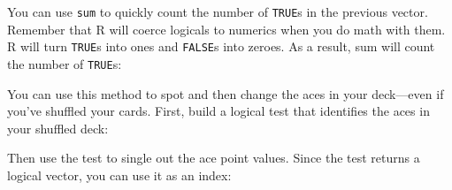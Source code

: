 \documentclass[
  letterpaper,
  DIV=11,
  numbers=noendperiod]{scrbook}
\newenvironment{Shaded}{\begin{snugshade}}{\end{snugshade}}
\newcommand{\DocumentationTok}[1]{\textcolor[rgb]{0.37,0.37,0.37}{\textit{#1}}}
\newcommand{\FunctionTok}[1]{\textcolor[rgb]{0.28,0.35,0.67}{#1}}
\newcommand{\NormalTok}[1]{\textcolor[rgb]{0.00,0.23,0.31}{#1}}
\newcommand{\SpecialCharTok}[1]{\textcolor[rgb]{0.37,0.37,0.37}{#1}}
\newcommand{\StringTok}[1]{\textcolor[rgb]{0.13,0.47,0.30}{#1}}
\begin{document}
\begin{Shaded}
\end{Shaded}

You can use \texttt{sum} to quickly count the number of \texttt{TRUE}s
in the previous vector. Remember that R will coerce logicals to numerics
when you do math with them. R will turn \texttt{TRUE}s into ones and
\texttt{FALSE}s into zeroes. As a result, sum will count the number of
\texttt{TRUE}s:

\begin{Shaded}
\end{Shaded}

You can use this method to spot and then change the aces in your
deck---even if you've shuffled your cards. First, build a logical test
that identifies the aces in your shuffled deck:

\begin{Shaded}
\end{Shaded}

Then use the test to single out the ace point values. Since the test
returns a logical vector, you can use it as an index:

\begin{Shaded}
\end{Shaded}
\end{document}
